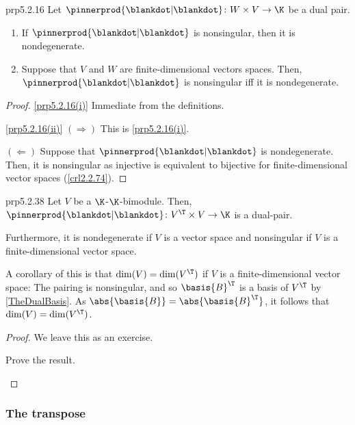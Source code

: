 \begin{prp}{}{prp5.2.16}
	Let $\pinnerprod{\blankdot |\blankdot}\colon W\times V\rightarrow \K$ be a dual pair.
	\begin{enumerate}
		\item \label{prp5.2.16(i)}If $\pinnerprod{\blankdot |\blankdot}$ is nonsingular, then it is nondegenerate.
		\item \label{prp5.2.16(ii)}Suppose that $V$ and $W$ are finite-dimensional vectors spaces.  Then, $\pinnerprod{\blankdot |\blankdot}$ is nonsingular iff it is nondegenerate.
	\end{enumerate}
	\begin{proof}
		\cref{prp5.2.16(i)} Immediate from the definitions.
		
		\blni
		\cref{prp5.2.16(ii)} $(\Rightarrow )$ This is \cref{prp5.2.16(i)}.
		
		$(\Leftarrow )$ Suppose that $\pinnerprod{\blankdot |\blankdot}$ is nondegenerate.  Then, it is nonsingular as injective is equivalent to bijective for finite-dimensional vector spaces (\cref{crl2.2.74}).
	\end{proof}
\end{prp}
\begin{prp}{}{prp5.2.38}
	Let $V$ be a $\K$-$\K$-bimodule.  Then, $\pinnerprod{\blankdot |\blankdot}\colon V^{\T}\times V\rightarrow \K$ is a dual-pair.
	
	Furthermore, it is nondegenerate if $V$ is a vector space and nonsingular if $V$ is a finite-dimensional vector space.
	\begin{rmk}
		A corollary of this is that $\dim (V)=\dim (V^{\T})$ if $V$ is a finite-dimensional vector space:  The pairing is nonsingular, and so $\basis{B}^{\T}$ is a basis of $V^{\T}$ by \cref{TheDualBasis}.  As $\abs{\basis{B}}=\abs{\basis{B}^{\T}}$, it follows that $\dim (V)=\dim (V^{\T})$.
	\end{rmk}
	\begin{proof}
		We leave this as an exercise.
		\begin{exr}[breakable=false]{}{}
			Prove the result.
		\end{exr}
	\end{proof}
\end{prp}

\subsubsection{The transpose}

